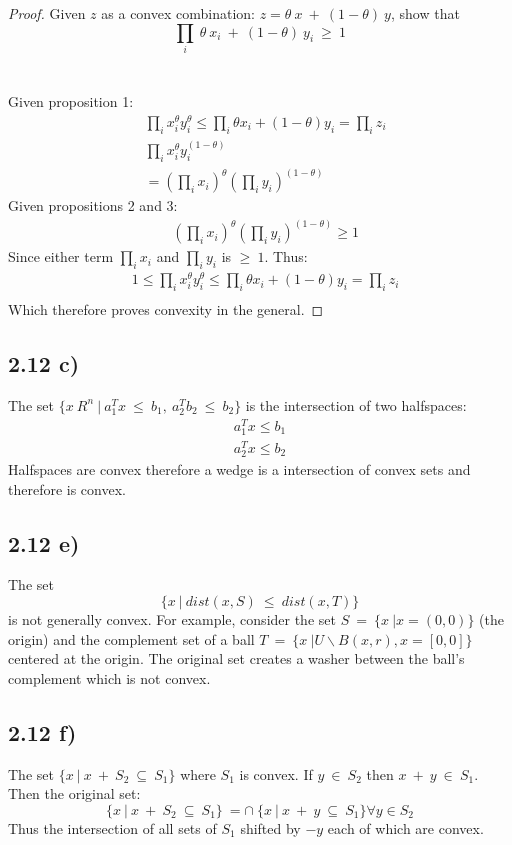 \documentclass[12pt]{article}
\begin{document}
\begin{proof}
Given $z$ as a convex combination: $z=\theta\ x\ +\ (1-\theta)\ y$, show that $$\prod_{i}\ \theta\ x_i\ +\ (1-\theta)\ y_i\ \ge\ 1$$\\\\

Given proposition 1:
\begin{align*}
& \prod_{i} x_i^\theta y_i^\theta  \le \prod_{i} \theta x_i + (1-\theta) y_i = \prod_{i}z_i\\
& \prod_{i} x_i^\theta y_i^{(1-\theta)}\\
& = (\prod_{i}x_i)^\theta (\prod_{i}y_i)^{(1-\theta)}
\end{align*}
Given propositions 2 and 3:
\begin{align*}
&(\prod_{i}x_i)^\theta (\prod_{i}y_i)^{(1-\theta)} \ge 1
\end{align*}
Since either term $\prod_{i}x_i$ and $\prod_{i}y_i$ is $\ge\ 1$.
Thus:
\begin{align*}
& 1 \le \prod_{i} x_i^\theta y_i^\theta  \le \prod_{i} \theta x_i + (1-\theta) y_i = \prod_{i}z_i\\
\end{align*}
Which therefore proves convexity in the general.
\end{proof}

\subsection*{2.12 c)}
The set $\{x\ R^n\ |\ a_1^Tx\ \le\ b_1,\ a_2^Tb_2\ \le\ b_2\}$ is the intersection of two halfspaces:
\begin{align*}
a_1^Tx \le b_1\\
a_2^Tx \le b_2
\end{align*}
Halfspaces are convex therefore a wedge is a intersection of convex sets and therefore is convex.

\subsection*{2.12 e)}
The set $$\{x\ |\ dist(x,S)\ \le\ dist(x,T)\}$$ is not generally convex.
For example, consider the set $S\ =\ \{x\ | x=(0,0)\}$ (the origin) and the complement set of a ball $T\ =\ \{x\ | U\backslash B(x,r), x=[0,0]\}$ centered at the origin. The original set creates a washer between the ball's complement which is not convex.

\subsection*{2.12 f)}
The set $\{x\ |\ x\ +\ S_2\ \subseteq\ S_1 \}$ where $S_1$ is convex. If $y\ \in\ S_2$ then $x\ +\ y\ \in\ S_1$. Then the original set: $$\{x\ |\ x\ +\ S_2\ \subseteq\ S_1 \}\ = \cap\ \{x\ |\ x\ +\ y\ \subseteq\ S_1\} \forall y \in S_2$$
Thus the intersection of all sets of $S_1$ shifted by $-y$ each of which are convex.
\end{document}

